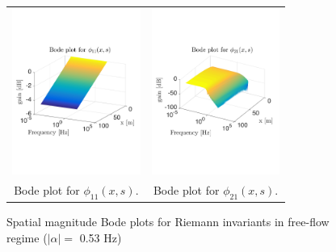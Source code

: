 \documentclass[5p,twocolumn]{elsarticle}
\begin{document}
\begin{figure}
\centering
\begin{tabular}{cc}
\includegraphics[trim = 0mm 60mm 0mm 60mm, width = 4.2cm]{distr_phi_11}
&
\includegraphics[trim = 0mm 60mm 0mm 60mm, width = 4.2cm]{distr_phi_21}
\tabularnewline
Bode plot for $\phi_{11}(x,s)$.
&
Bode plot for $\phi_{21}(x,s)$.
\tabularnewline

\end{tabular}
\caption{Spatial magnitude Bode plots for Riemann invariants in free-flow regime ($\left|\alpha\right| = $ 0.53 Hz)\label{fig:Magn_spatial_diag}}
\end{figure}
\end{document}
